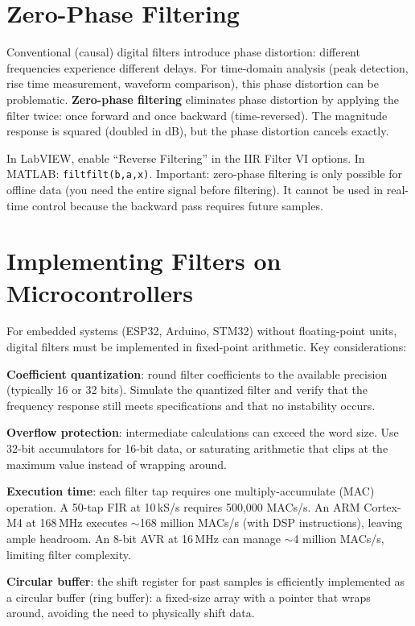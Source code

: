 \documentclass[11pt,letterpaper,twoside,openany]{book}
\begin{document}
\section{Zero-Phase Filtering}
Conventional (causal) digital filters introduce phase distortion: different frequencies experience different delays. For time-domain analysis (peak detection, rise time measurement, waveform comparison), this phase distortion can be problematic. \textbf{Zero-phase filtering} eliminates phase distortion by applying the filter twice: once forward and once backward (time-reversed). The magnitude response is squared (doubled in dB), but the phase distortion cancels exactly.

In LabVIEW, enable ``Reverse Filtering'' in the IIR Filter VI options. In MATLAB: \texttt{filtfilt(b,a,x)}. Important: zero-phase filtering is only possible for offline data (you need the entire signal before filtering). It cannot be used in real-time control because the backward pass requires future samples.

\section{Implementing Filters on Microcontrollers}
For embedded systems (ESP32, Arduino, STM32) without floating-point units, digital filters must be implemented in fixed-point arithmetic. Key considerations:

\textbf{Coefficient quantization}: round filter coefficients to the available precision (typically 16 or 32 bits). Simulate the quantized filter and verify that the frequency response still meets specifications and that no instability occurs.

\textbf{Overflow protection}: intermediate calculations can exceed the word size. Use 32-bit accumulators for 16-bit data, or saturating arithmetic that clips at the maximum value instead of wrapping around.

\textbf{Execution time}: each filter tap requires one multiply-accumulate (MAC) operation. A 50-tap FIR at 10\,kS/s requires 500,000 MACs/s. An ARM Cortex-M4 at 168\,MHz executes $\sim$168 million MACs/s (with DSP instructions), leaving ample headroom. An 8-bit AVR at 16\,MHz can manage $\sim$4 million MACs/s, limiting filter complexity.

\textbf{Circular buffer}: the shift register for past samples is efficiently implemented as a circular buffer (ring buffer): a fixed-size array with a pointer that wraps around, avoiding the need to physically shift data.
\end{document}
